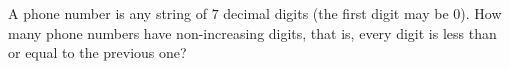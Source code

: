 A phone number is any string of $7$ decimal digits (the first digit may be $0$). How many phone numbers have non-increasing digits, that is, every digit is less than or equal to the previous one?
